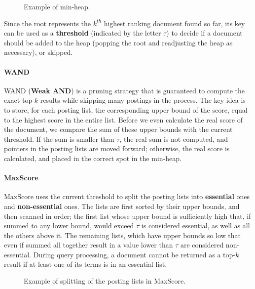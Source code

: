 \begin{figure}[!ht]
    \centering
    
    \caption{Example of min-heap.}
    \label{fig:min-heap}
\end{figure}

Since the root represents the $k^{th}$ highest ranking document found so far, its key can be used as a \textbf{threshold} (indicated by the letter $\tau$) to decide if a document should be added to the heap (popping the root and readjusting the heap as necessary), or skipped.

\paragraph{WAND}

WAND (\textbf{Weak AND}) is a pruning strategy that is guaranteed to compute the exact top-$k$ results while skipping many postings in the process. The key idea is to store, for each posting list, the corresponding upper bound of the score, equal to the highest score in the entire list. Before we even calculate the real score of the document, we compare the sum of these upper bounds with the current threshold. If the sum is smaller than $\tau$, the real sum is not computed, and pointers in the posting lists are moved forward; otherwise, the real score is calculated, and placed in the correct spot in the min-heap.

\paragraph{MaxScore}

MaxScore uses the current threshold to split the posting lists into \textbf{essential} ones and \textbf{non-essential} ones. The lists are first sorted by their upper bounds, and then scanned in order; the first list whose upper bound is sufficiently high that, if summed to any lower bound, would exceed $\tau$ is considered essential, as well as all the others above it. The remaining lists, which have upper bounds so low that even if summed all together result in a value lower than $\tau$ are considered non-essential. During query processing, a document cannot be returned as a top-$k$ result if at least one of its terms is in an essential list.

\begin{figure}[!ht]
    \centering
    
    \caption{Example of splitting of the posting lists in MaxScore.}
    \label{fig:maxscore}
\end{figure}